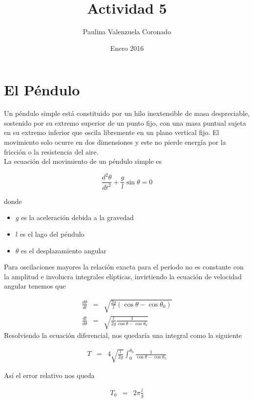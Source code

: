\documentclass[12pt]{article}
\title{Actividad 5}
\author{Paulina Valenzuela Coronado}
\date{Enero 2016}
\begin{document}
\maketitle

\section{El Péndulo}

Un péndulo simple está constituido por un hilo inextensible de masa despreciable, sostenido por su extremo superior de un punto fijo, con una masa puntual sujeta en su extremo inferior que oscila libremente en un plano vertical fijo.
El movimiento solo ocurre en dos dimensiones y este no pierde energía por la fricción o la resistencia del aire.\cite{Wiki} \\

La ecuación del movimiento de un péndulo simple es 

\begin{equation}
\frac{
d^2\theta}{dt^2}+\frac{g}{l}\sin\theta=0
\end{equation}

donde
\begin{itemize}
\item $g$ es la aceleración debida a la gravedad
\item $l$ es el lago del péndulo
\item $\theta$ es el desplazamiento angular 
\end{itemize}


Para oscilaciones mayores la relación exacta para el período no es constante con la amplitud e involucra integrales elípticas, invirtiendo la ecuación de velocidad angular tenemos que 

\begin{eqnarray}
\nonumber \frac{d\theta}{dt} & = & \sqrt{\frac{2g}{l}(\cos\theta-\cos\theta_0)}\\
\nonumber \frac{dt}{d\theta} & = & \sqrt{\frac{l}{2g}\frac{1}{\cos\theta-\cos\theta_0}}
\end{eqnarray}
Resolviendo la ecuación diferencial, nos quedaría una integral como la siguiente

\begin{eqnarray}
T & = & 4 \sqrt{\frac{l}{2g}}\int_{0}^{\theta_0} \frac{1}{\cos\theta-\cos\theta_0}
\end{eqnarray}

Así el error relativo nos queda

\begin{eqnarray}
\nonumber T_0 & = & 2\pi\frac{l}{g}
\end{eqnarray}
\end{document}
